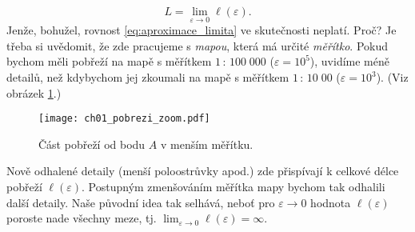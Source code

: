 \begin{equation}\label{eq:aproximace_limita}
    L=\lim_{\varepsilon\to0}{\ell(\varepsilon)}.
\end{equation}
Jenže, bohužel, rovnost \eqref{eq:aproximace_limita} ve skutečnosti neplatí. Proč? Je třeba si uvědomit, že zde pracujeme s \emph{mapou}, která má určité \emph{měřítko}. Pokud bychom měli pobřeží na mapě s měřítkem $1\,:\,100\;000$ ($\varepsilon=10^5$), uvidíme méně detailů, než kdybychom jej zkoumali na mapě s měřítkem $1\,:\,10\;00$ ($\varepsilon=10^3$). (Viz obrázek \ref{fig:pobrezi_zoom}.)\par
\begin{figure}[h]
    \centering
    \texttt{[image: ch01\_pobrezi\_zoom.pdf]}
    \caption{Část pobřeží od bodu $A$ v menším měřítku.}
    \label{fig:pobrezi_zoom}
\end{figure}
Nově odhalené detaily (menší poloostrůvky apod.) zde přispívají k celkové délce pobřeží $\ell(\varepsilon)$. Postupným zmenšováním měřítka mapy bychom tak odhalili další detaily. Naše původní idea tak selhává, neboť pro $\varepsilon\to0$ hodnota $\ell(\varepsilon)$ poroste nade všechny meze, tj. $\lim_{\varepsilon\to0}{\ell(\varepsilon)}=\infty$.

